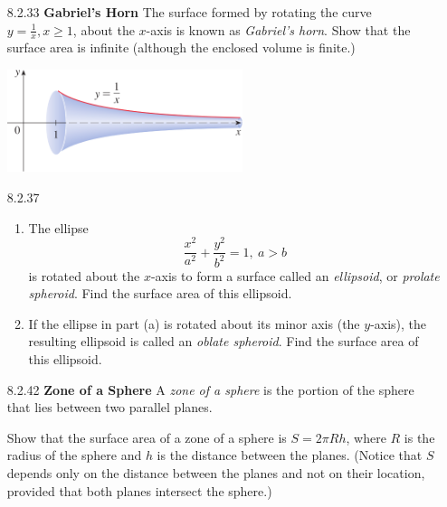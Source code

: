 \documentclass{article}
\begin{document}
\begin{enumerate}
\newpage

\item[8.2.33]
    \textbf{Gabriel's Horn} The surface formed by rotating the curve
    $y=\frac{1}{x}, x \geqslant 1$, about the $x$-axis is known as
    \textit{Gabriel's horn}. Show that the surface area is infinite (although the
    enclosed volume is finite.)

    \begin{center}
        \includegraphics[height=3cm]{./png/8.2.33.png}
    \end{center}

\vspace{7cm}

\item[8.2.37]
    \begin{enumerate}
        \item The ellipse
            \[
                \frac{x^{2}}{a^{2}} + \frac{y^{2}}{b^{2}} = 1,\ a > b
            \]
            is rotated about the $x$-axis to form a surface called an \textit{ellipsoid},
            or \textit{prolate spheroid}. Find the surface area of this ellipsoid.
        \item If the ellipse in part (a) is rotated about its minor axis
            (the $y$-axis), the resulting ellipsoid is called an
            \textit{oblate spheroid}. Find the surface area of this ellipsoid.
    \end{enumerate}

\newpage


\item[8.2.42]
    \textbf{Zone of a Sphere} A \textit{zone of a sphere} is the portion of the
    sphere that lies between two parallel planes.

    Show that the surface area of a zone of a sphere is $S = 2\pi R h$,
    where $R$ is the radius of the sphere and $h$ is the distance between
    the planes. (Notice that $S$ depends only on the distance between the planes
    and not on their location, provided that both planes intersect the sphere.)

\vspace{5cm}


\end{enumerate}
\end{document}
